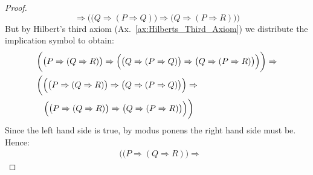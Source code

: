 \begin{proof}
\begin{equation}
            \Rightarrow
            \Big(
                \big(
                    Q\Rightarrow(P\Rightarrow{Q})
                \big)
                \Rightarrow
                \big(
                    Q\Rightarrow(P\Rightarrow{R})
                \big)
            \Big)
        \end{equation}
        But by Hilbert's third axiom (Ax.~\ref{ax:Hilberts_Third_Axiom}) we
        distribute the implication symbol to obtain:
        \begin{equation}
            \begin{split}
                &
                \bigg(
                    \big(
                        P\Rightarrow(Q\Rightarrow{R})
                    \big)
                    \Rightarrow
                    \Big(
                        \big(
                            Q\Rightarrow(P\Rightarrow{Q})
                        \big)
                        \Rightarrow
                        \big(
                            Q\Rightarrow(P\Rightarrow{R})
                        \big)
                    \Big)
                \bigg)\Rightarrow\\
                &
                \bigg(
                    \Big(
                        \big(
                            P\Rightarrow(Q\Rightarrow{R})
                        \big)
                        \Rightarrow
                        \big(
                            Q\Rightarrow(P\Rightarrow{Q})
                        \big)
                    \Big)
                    \Rightarrow\\
                &\hspace{2ex}
                    \Big(
                        \big(
                            P\Rightarrow(Q\Rightarrow{R})
                        \big)
                        \Rightarrow
                        \big(
                            Q\Rightarrow(P\Rightarrow{R})
                        \big)
                    \Big)
                \bigg)
            \end{split}
        \end{equation}
        Since the left hand side is true, by modus ponens the right hand side
        must be. Hence:
        \begin{equation}
            \label{eqn:precursor_to_hypothetical_syllogism_2_almost_done}%
            \begin{split}
                &\Big(
                    \big(
                        P\Rightarrow(Q\Rightarrow{R})
                    \big)
                    \Rightarrow

\end{split}
\end{equation}
\end{proof}
